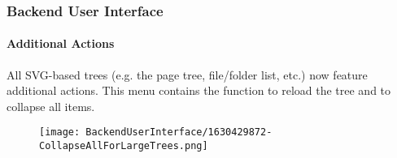%

\begin{frame}[fragile]
	\frametitle{Backend User Interface}
	\framesubtitle{Additional Actions}

	All SVG-based trees (e.g. the page tree, file/folder list, etc.) now feature
	additional actions. This menu contains the function to reload the tree and
	to collapse all items.

	\begin{figure}
		\texttt{[image: BackendUserInterface/1630429872-CollapseAllForLargeTrees.png]}
	\end{figure}

\end{frame}


